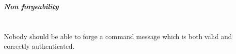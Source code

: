 \subparagraph{\textit{Non forgeability}} \hspace{0pt} \\
\small{Nobody should be able to forge a command message which is both valid and correctly authenticated.}